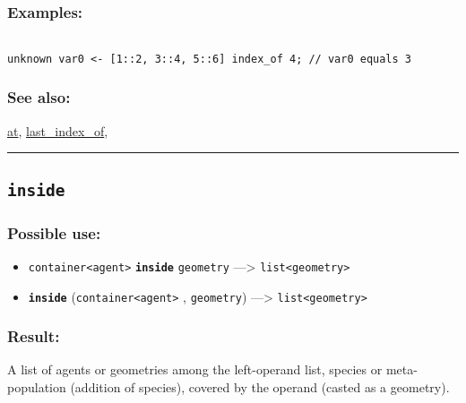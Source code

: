 \documentclass[]{book}
\providecommand{\tightlist}{%
  \setlength{\itemsep}{0pt}\setlength{\parskip}{0pt}}
\theoremstyle{definition}
\theoremstyle{definition}
\theoremstyle{definition}
\theoremstyle{remark}
\begin{document}
\subsubsection{Examples:}\label{examples-208}

\begin{verbatim}
 
unknown var0 <- [1::2, 3::4, 5::6] index_of 4; // var0 equals 3
\end{verbatim}

\subsubsection{See also:}\label{see-also-117}

\href{OperatorsAA\#at}{at},
\href{OperatorsIM\#last_index_of}{last\_index\_of},

\begin{center}\rule{0.5\linewidth}{\linethickness}\end{center}

\subsection{\texorpdfstring{\texttt{inside}}{inside}}\label{inside}

\subsubsection{Possible use:}\label{possible-use-275}

\begin{itemize}
\tightlist
\item
  \texttt{container\textless{}agent\textgreater{}}
  \textbf{\texttt{inside}} \texttt{geometry} ---\textgreater{}
  \texttt{list\textless{}geometry\textgreater{}}
\item
  \textbf{\texttt{inside}}
  (\texttt{container\textless{}agent\textgreater{}} , \texttt{geometry})
  ---\textgreater{} \texttt{list\textless{}geometry\textgreater{}}
\end{itemize}

\subsubsection{Result:}\label{result-265}

A list of agents or geometries among the left-operand list, species or
meta-population (addition of species), covered by the operand (casted as
a geometry).
\end{document}
